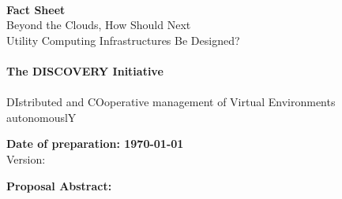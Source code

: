 \documentclass[11pt,a4paper,twoside]{article}
\newcommand{\AL}[2][inline]{\todo[color=green!50,#1]{\sf \textbf{AL:} #2}}
\newcommand{\AL}[2][]{}
\begin{document}

\sffamily
\thispagestyle{empty}
\begin{center}
{\large \textbf{}}\\
\vspace*{.5cm} 
\large{\textbf{Fact Sheet}}\\
\vspace*{.5cm} 
{\LARGE Beyond the Clouds, How Should Next\\ Utility Computing Infrastructures Be Designed?}\\~\\
{\LARGE \textbf{The DISCOVERY Initiative}\\~\\
{\LARGE DIstributed and COoperative management of Virtual Environments autonomouslY}}\\
\end{center}

\begin{center}
\large{\textbf{Date of preparation: \today}}\\
\large{Version:~\isodayandtime}
\end{center}


\vspace*{2cm}
\noindent \textbf{\large{Proposal Abstract:}}\\
\end{document}
